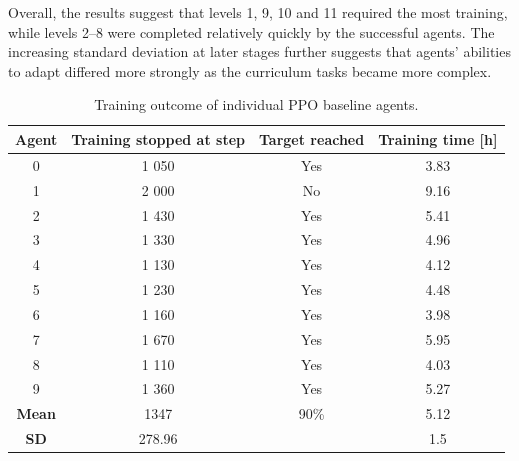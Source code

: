 Overall, the results suggest that levels 1, 9, 10 and 11 required the most training, while levels 2–8 were completed relatively quickly by the successful agents. The increasing standard deviation at later stages further suggests that agents' abilities to adapt differed more strongly as the curriculum tasks became more complex.
\begin{table}[H]
	\centering
	\caption{
		Training outcome of individual PPO baseline agents.
	}
	\label{tab:baseline_training_time}
	
	\begin{tabular}{c c c c}
		\toprule
		
		\textbf{Agent}
		&
		\textbf{Training stopped at step}
		&
		\textbf{Target reached}
		&
		\textbf{Training time [h]}
		\\
		
		\midrule
		
		0  & 1 050 & Yes & 3.83 \\
		1  & 2 000 & No & 9.16 \\
		2  & 1 430 & Yes & 5.41 \\
		3  & 1 330 & Yes & 4.96 \\
		4  & 1 130 & Yes & 4.12 \\
		5  & 1 230 & Yes & 4.48 \\
		6  & 1 160 & Yes & 3.98 \\
		7  & 1 670 & Yes & 5.95 \\
		8  & 1 110 & Yes & 4.03 \\
		9  & 1 360 & Yes & 5.27 \\
		
		\midrule
		
		\textbf{Mean}
		&
		1347
		&
		90\%
		&
		5.12 \\
		
		\textbf{SD}
		&
		278.96
		&
		
		&
		1.5 \\
		
		\bottomrule
	\end{tabular}
	
	
\end{table}

